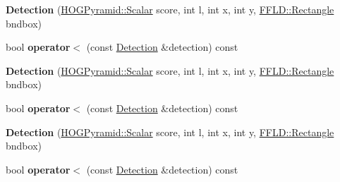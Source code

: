 \begin{DoxyCompactItemize}
\item 
\hypertarget{struct_detection_a02c65365d9b9644cfc93afca0c03dc8b}{{\bfseries Detection} (\hyperlink{class_f_f_l_d_1_1_h_o_g_pyramid_af17c08ed86557e0a0aecb4814daf87c3}{H\-O\-G\-Pyramid\-::\-Scalar} score, int l, int x, int y, \hyperlink{class_f_f_l_d_1_1_rectangle}{F\-F\-L\-D\-::\-Rectangle} bndbox)}\label{struct_detection_a02c65365d9b9644cfc93afca0c03dc8b}

\item 
\hypertarget{struct_detection_a0664ad2933e1ae586236a9b575b2d496}{bool {\bfseries operator$<$} (const \hyperlink{struct_detection}{Detection} \&detection) const }\label{struct_detection_a0664ad2933e1ae586236a9b575b2d496}

\item 
\hypertarget{struct_detection_a02c65365d9b9644cfc93afca0c03dc8b}{{\bfseries Detection} (\hyperlink{class_f_f_l_d_1_1_h_o_g_pyramid_af17c08ed86557e0a0aecb4814daf87c3}{H\-O\-G\-Pyramid\-::\-Scalar} score, int l, int x, int y, \hyperlink{class_f_f_l_d_1_1_rectangle}{F\-F\-L\-D\-::\-Rectangle} bndbox)}\label{struct_detection_a02c65365d9b9644cfc93afca0c03dc8b}

\item 
\hypertarget{struct_detection_a0664ad2933e1ae586236a9b575b2d496}{bool {\bfseries operator$<$} (const \hyperlink{struct_detection}{Detection} \&detection) const }\label{struct_detection_a0664ad2933e1ae586236a9b575b2d496}

\item 
\hypertarget{struct_detection_a02c65365d9b9644cfc93afca0c03dc8b}{{\bfseries Detection} (\hyperlink{class_f_f_l_d_1_1_h_o_g_pyramid_af17c08ed86557e0a0aecb4814daf87c3}{H\-O\-G\-Pyramid\-::\-Scalar} score, int l, int x, int y, \hyperlink{class_f_f_l_d_1_1_rectangle}{F\-F\-L\-D\-::\-Rectangle} bndbox)}\label{struct_detection_a02c65365d9b9644cfc93afca0c03dc8b}

\item 
\hypertarget{struct_detection_a0664ad2933e1ae586236a9b575b2d496}{bool {\bfseries operator$<$} (const \hyperlink{struct_detection}{Detection} \&detection) const }\label{struct_detection_a0664ad2933e1ae586236a9b575b2d496}

\end{DoxyCompactItemize}
